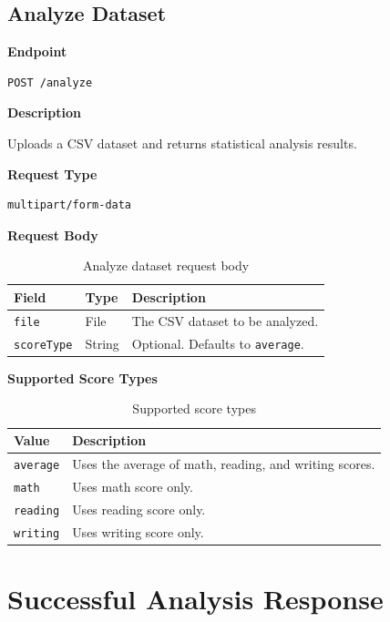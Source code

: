 \documentclass[12pt,a4paper]{article}
\begin{document}
\newpage

\subsection{Analyze Dataset}

\textbf{Endpoint}

\begin{lstlisting}
POST /analyze
\end{lstlisting}

\textbf{Description}

Uploads a CSV dataset and returns statistical analysis results.

\textbf{Request Type}

\begin{lstlisting}
multipart/form-data
\end{lstlisting}

\textbf{Request Body}

\begin{table}[h!]
\centering
\renewcommand{\arraystretch}{1.4}
\begin{tabular}{p{4cm} p{3cm} p{6cm}}
\toprule
\textbf{Field} & \textbf{Type} & \textbf{Description} \\
\midrule
\texttt{file} & File & The CSV dataset to be analyzed. \\
\texttt{scoreType} & String & Optional. Defaults to \texttt{average}. \\
\bottomrule
\end{tabular}
\caption{Analyze dataset request body}
\end{table}

\textbf{Supported Score Types}

\begin{table}[h!]
\centering
\renewcommand{\arraystretch}{1.4}
\begin{tabular}{p{4cm} p{8cm}}
\toprule
\textbf{Value} & \textbf{Description} \\
\midrule
\texttt{average} & Uses the average of math, reading, and writing scores. \\
\texttt{math} & Uses math score only. \\
\texttt{reading} & Uses reading score only. \\
\texttt{writing} & Uses writing score only. \\
\bottomrule
\end{tabular}
\caption{Supported score types}
\end{table}

\section{Successful Analysis Response}
\end{document}
